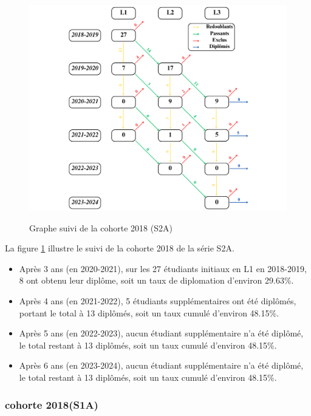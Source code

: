 \begin{figure}[ht]
    \centering
    \caption{Graphe suivi de la cohorte 2018 (S2A)}
    \includegraphics[width=1\textwidth]{figure/S2A_2018.png}
    \label{fig:cohorte_s2a_2018}
\end{figure}

La figure \ref{fig:cohorte_s2a_2018} illustre le suivi de la cohorte 2018 de la série S2A.
\begin{itemize}
    \item Après 3 ans (en 2020-2021), sur les 27 étudiants initiaux en L1 en 2018-2019, 8 ont obtenu leur diplôme, soit un taux de diplomation d'environ 29.63\%.
    \item Après 4 ans (en 2021-2022), 5 étudiants supplémentaires ont été diplômés, portant le total à 13 diplômés, soit un taux cumulé d'environ 48.15\%.
    \item Après 5 ans (en 2022-2023), aucun étudiant supplémentaire n'a été diplômé, le total restant à 13 diplômés, soit un taux cumulé d'environ 48.15\%.
    \item Après 6 ans (en 2023-2024), aucun étudiant supplémentaire n'a été diplômé, le total restant à 13 diplômés, soit un taux cumulé d'environ 48.15\%.
\end{itemize}

\newpage
\subsubsection{cohorte 2018(S1A)}

